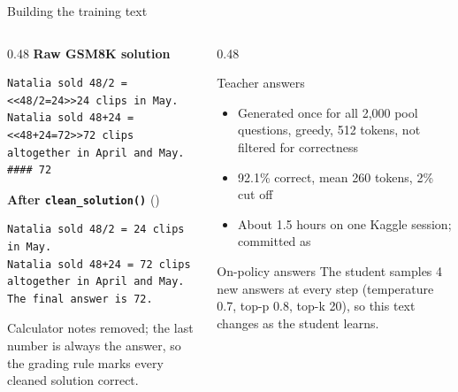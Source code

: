 \begin{frame}[fragile]{Building the training text\hfill{}}
  \begin{columns}[T]
    \begin{column}{0.48\textwidth}
      \scriptsize\textbf{Raw GSM8K solution}
\begin{lstlisting}[style=kdplain]
Natalia sold 48/2 = <<48/2=24>>24 clips in May.
Natalia sold 48+24 = <<48+24=72>>72 clips
altogether in April and May.
#### 72
\end{lstlisting}
      \scriptsize\textbf{After \texttt{clean\_solution()}} ()
\begin{lstlisting}[style=kdplain]
Natalia sold 48/2 = 24 clips in May.
Natalia sold 48+24 = 72 clips
altogether in April and May.
The final answer is 72.
\end{lstlisting}
      \tiny Calculator notes removed; the last number is always the answer,
      so the grading rule marks every cleaned solution correct.
    \end{column}
    \begin{column}{0.48\textwidth}
      \begin{block}{Teacher answers \ours}
        \footnotesize
        \begin{itemize}
          \item Generated once for all 2,000 pool questions, greedy,
                512 tokens, not filtered for correctness
          \item 92.1\% correct, mean 260 tokens, 2\% cut off
          \item About 1.5 hours on one Kaggle session; committed as
        \end{itemize}
      \end{block}
      \begin{block}{On-policy answers}
        \footnotesize
        The student samples 4 new answers at every step
        (temperature 0.7, top-p 0.8, top-k 20), so this text changes as
        the student learns.
      \end{block}
    \end{column}
  \end{columns}
\end{frame}

